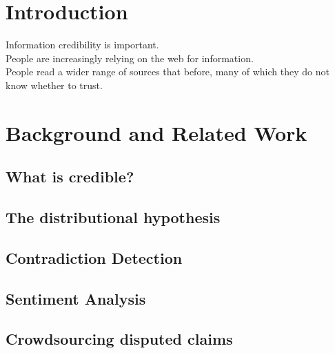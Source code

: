 \documentclass{www2010-submission}
\newcommand{\todo}[1]{}
\newcommand{\x}[1]{{\color{blue} #1}\\}
\begin{document}








\section{Introduction}

\x{Information credibility is important.}
\x{People are increasingly relying on the web for information.}
\x{People read a wider range of sources that before, many of which they do not know whether to trust.}

\section{Background and Related Work}

\subsection{What is credible?}


\subsection{The distributional hypothesis}

\subsection{Contradiction Detection}

\subsection{Sentiment Analysis}

\subsection{Crowdsourcing disputed claims}
\end{document}
